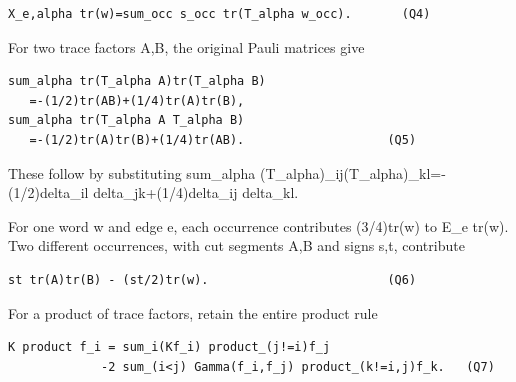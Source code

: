 \documentclass[11pt,a4paper]{article}
\renewcommand{\[}{\begingroup\small\originaldisplaystart}
\renewcommand{\]}{\originaldisplayend\endgroup}
\begin{document}
\begin{verbatim}
X_e,alpha tr(w)=sum_occ s_occ tr(T_alpha w_occ).       (Q4)
\end{verbatim}

For two trace factors A,B, the original Pauli matrices give

\begin{verbatim}
sum_alpha tr(T_alpha A)tr(T_alpha B)
   =-(1/2)tr(AB)+(1/4)tr(A)tr(B),
sum_alpha tr(T_alpha A T_alpha B)
   =-(1/2)tr(A)tr(B)+(1/4)tr(AB).                    (Q5)
\end{verbatim}

These follow by substituting
{\ttfamily s\allowbreak{}u\allowbreak{}m\allowbreak{}\_\allowbreak{}a\allowbreak{}l\allowbreak{}p\allowbreak{}h\allowbreak{}a\allowbreak{} \allowbreak{}(\allowbreak{}T\allowbreak{}\_\allowbreak{}a\allowbreak{}l\allowbreak{}p\allowbreak{}h\allowbreak{}a\allowbreak{})\allowbreak{}\_\allowbreak{}i\allowbreak{}j\allowbreak{}(\allowbreak{}T\allowbreak{}\_\allowbreak{}a\allowbreak{}l\allowbreak{}p\allowbreak{}h\allowbreak{}a\allowbreak{})\allowbreak{}\_\allowbreak{}k\allowbreak{}l\allowbreak{}=\allowbreak{}-\allowbreak{}(\allowbreak{}1\allowbreak{}/\allowbreak{}2\allowbreak{})\allowbreak{}d\allowbreak{}e\allowbreak{}l\allowbreak{}t\allowbreak{}a\allowbreak{}\_\allowbreak{}i\allowbreak{}l\allowbreak{} \allowbreak{}d\allowbreak{}e\allowbreak{}l\allowbreak{}t\allowbreak{}a\allowbreak{}\_\allowbreak{}j\allowbreak{}k\allowbreak{}+\allowbreak{}(\allowbreak{}1\allowbreak{}/\allowbreak{}4\allowbreak{})\allowbreak{}d\allowbreak{}e\allowbreak{}l\allowbreak{}t\allowbreak{}a\allowbreak{}\_\allowbreak{}i\allowbreak{}j\allowbreak{} \allowbreak{}d\allowbreak{}e\allowbreak{}l\allowbreak{}t\allowbreak{}a\allowbreak{}\_\allowbreak{}k\allowbreak{}l\allowbreak{}}.

For one word w and edge e, each occurrence contributes (3/4)tr(w) to
E\_e tr(w). Two different occurrences, with cut segments A,B and signs
s,t, contribute

\begin{verbatim}
st tr(A)tr(B) - (st/2)tr(w).                         (Q6)
\end{verbatim}

For a product of trace factors, retain the entire product rule

\begin{verbatim}
K product f_i = sum_i(Kf_i) product_(j!=i)f_j
             -2 sum_(i<j) Gamma(f_i,f_j) product_(k!=i,j)f_k.   (Q7)
\end{verbatim}
\end{document}

